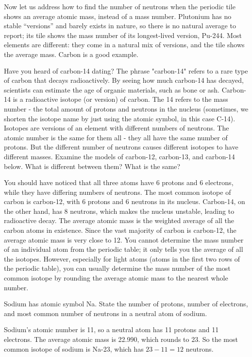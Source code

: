 Now let us address how to find
the number of neutrons when the periodic tile shows an average atomic mass,
instead of a mass number. Plutonium has no stable ``versions'' and barely exists in nature, so there is no natural average to report; its tile shows the mass number of its longest-lived version, Pu-244. Most elements are different: they come in a natural mix of versions, and the tile shows the average mass. Carbon is a good example.

Have you heard of carbon-14 dating? The phrase "carbon-14" refers to a rare
type of carbon that decays radioactively. By seeing how much carbon-14 has
decayed, scientists can estimate the age of organic materials, such as bone or
ash. Carbon-14 is a radioactive isotope (or version) of carbon. The 14 refers to
the mass number - the total amount of protons and neutrons in the nucleus
(sometimes, we shorten the isotope name by just using the atomic symbol, in
this case C-14). Isotopes are versions of an element with different numbers of
neutrons. The atomic number is the same for them all - they all have the same
number of protons. But the different number of neutrons causes different
isotopes to have different masses. Examine the models of carbon-12, carbon-13,
and carbon-14 below. What is different between them? What is the same?



You should have noticed that all three atoms have 6 protons and 6 electrons,
while they have differing numbers of neutrons. The most common isotope of carbon
is carbon-12, with 6 protons and 6 neutrons in its nucleus. Carbon-14, on the
other hand, has 8 neutrons, which makes the nucleus unstable, leading to
radioactive decay. The average atomic mass
is the weighted average of all the carbon atoms in existence. Since the vast
majority of carbon is carbon-12, the average atomic mass is very close to 12.
You cannot determine the mass number of an individual atom from the periodic
table; it only tells you the average of all the isotopes. However, especially
for light atoms (atoms in the first two rows of the periodic table), you can
usually determine the mass number of the most common isotope by rounding the
average atomic mass to the nearest whole number.

\begin{Worked}
\begin{Problem}
Sodium has atomic symbol Na. State the number of protons,
number of electrons, and most common number of neutrons in a neutral atom of
sodium.
\end{Problem}
\begin{Solution}
Sodium's atomic number is 11, so a neutral atom has 11 protons and
11 electrons. The average atomic mass is 22.990, which rounds to 23. So the
most common isotope of sodium is Na-23, which has $23 - 11 = 12$ neutrons.
\end{Solution}
\end{Worked}


